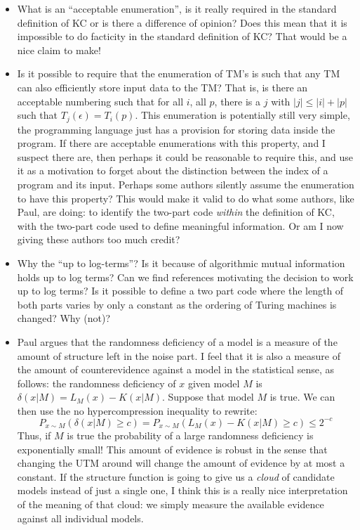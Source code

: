 \documentclass{article}
\begin{document}
\begin{itemize}
\item What is an ``acceptable enumeration'', is it really required in the standard definition of KC or is there a difference of opinion? Does this mean that it is impossible to do facticity in the standard definition of KC? That would be a nice claim to make!

\item Is it possible to require that the enumeration of TM's is such that any TM can also efficiently store input data to the TM? That is, is there an acceptable numbering such that for all $i$, all $p$, there is a $j$ with $|j|\le|i|+|p|$ such that $T_j(\epsilon)=T_i(p)$. This enumeration is potentially still very simple, the programming language just has a provision for storing data inside the program. If there are acceptable enumerations with this property, and I suspect there are, then perhaps it could be reasonable to require this, and use it as a motivation to forget about the distinction between the index of a program and its input. Perhaps some authors silently assume the enumeration to have this property? This would make it valid to do what some authors, like Paul, are doing: to identify the two-part code \emph{within} the definition of KC, with the two-part code used to define meaningful information. Or am I now giving these authors too much credit?

\item Why the ``up to log-terms''? Is it because of algorithmic mutual information holds up to log terms? Can we find references motivating the decision to work up to log terms? Is it possible to define a two part code where the length of both parts varies by only a constant as the ordering of Turing machines is changed? Why (not)?

\item Paul argues that the randomness deficiency of a model is a measure of the amount of structure left in the noise part. I feel that it is also a measure of the amount of counterevidence against a model in the statistical sense, as follows: the randomness deficiency of $x$ given model $M$ is $\delta(x|M)=L_M(x)-K(x|M)$. Suppose that model $M$ is true. We can then use the no hypercompression inequality to rewrite:
%
\[
P_{x\sim M}(\delta(x|M)\ge c) = P_{x\sim M}(L_M(x) - K(x|M) \ge c)\le 2^{-c}
\]
Thus, if $M$ is true the probability of a large randomness deficiency is exponentially small! This amount of evidence is robust in the sense that changing the UTM around will change the amount of evidence by at most a constant. If the structure function is going to give us a \emph{cloud} of candidate models instead of just a single one, I think this is a really nice interpretation of the meaning of that cloud: we simply measure the available evidence against all individual models.  


\end{itemize}
\end{document}
